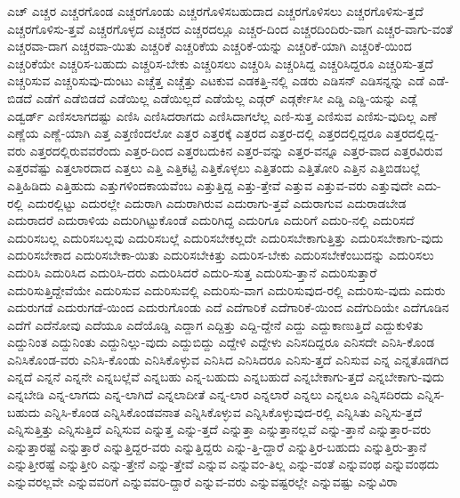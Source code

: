 {ಎಚ್
ಎಚ್ಚರ
ಎಚ್ಚರಗೊಂಡ
ಎಚ್ಚರಗೊಂಡು
ಎಚ್ಚರಗೊಳಿಸಬಹುದಾದ
ಎಚ್ಚರಗೊಳಿಸಲು
ಎಚ್ಚರಗೊಳಿಸು-ತ್ತದೆ
ಎಚ್ಚರಗೊಳಿಸು-ತ್ತವೆ
ಎಚ್ಚರಗೊಳ್ಳದ
ಎಚ್ಚರದ
ಎಚ್ಚರದಲ್ಲೂ
ಎಚ್ಚರ-ದಿಂದ
ಎಚ್ಚರದಿಂದಿರು-ವಾಗ
ಎಚ್ಚರ-ವಾಗು-ವಂತೆ
ಎಚ್ಚರವಾ-ದಾಗ
ಎಚ್ಚರವಾ-ಯಿತು
ಎಚ್ಚರಿಕೆ
ಎಚ್ಚರಿಕೆಯ
ಎಚ್ಚರಿಕೆ-ಯನ್ನು
ಎಚ್ಚರಿಕೆ-ಯಾಗಿ
ಎಚ್ಚರಿಕೆ-ಯಿಂದ
ಎಚ್ಚರಿಕೆಯೇ
ಎಚ್ಚರಿಸ-ಬಹುದು
ಎಚ್ಚರಿಸ-ಬೇಕು
ಎಚ್ಚರಿಸಲು
ಎಚ್ಚರಿಸಿ
ಎಚ್ಚರಿಸಿದ್ದ
ಎಚ್ಚರಿಸಿದ್ದರೂ
ಎಚ್ಚರಿಸು-ತ್ತದೆ
ಎಚ್ಚರಿಸುವ
ಎಚ್ಚರಿಸುವು-ದುಂಟು
ಎಚ್ಚೆತ್ತ
ಎಚ್ಚೆತ್ತು
ಎಟಕುವ
ಎಡಕತ್ತಿ-ನಲ್ಲಿ
ಎಡರು
ಎಡಿಸನ್
ಎಡಿಸನ್ನನ್ನು
ಎಡೆ
ಎಡೆ-ಬಿಡದೆ
ಎಡೆಗೆ
ಎಡೆಬಿಡದೆ
ಎಡೆಯಿಲ್ಲ
ಎಡೆಯಿಲ್ಲದೆ
ಎಡೆಯೆಲ್ಲ
ಎಡ್ಗರ್
ಎಡ್ಗರ್ಕೇಸೀ
ಎಡ್ಡಿ
ಎಡ್ಡಿ-ಯನ್ನು
ಎಡ್ಲೆ
ಎಡ್ವರ್ಡ್
ಎಣಿಸಲಾಗದಷ್ಟು
ಎಣಿಸಿ
ಎಣಿಸಿದರಾಗದು
ಎಣಿಸಿದಾಗಲೆಲ್ಲ
ಎಣಿ-ಸುತ್ತ
ಎಣಿಸುವ
ಎಣಿಸು-ವುದಿಲ್ಲ
ಎಣೆ
ಎಣ್ಣೆಯ
ಎಣ್ಣೆ-ಯಾಗಿ
ಎತ್ತ
ಎತ್ತಣಿಂದಲೋ
ಎತ್ತರ
ಎತ್ತರಕ್ಕೆ
ಎತ್ತರದ
ಎತ್ತರ-ದಲ್ಲಿ
ಎತ್ತರದಲ್ಲಿದ್ದರೂ
ಎತ್ತರದಲ್ಲಿದ್ದ-ವರು
ಎತ್ತರದಲ್ಲಿರುವವರೆಂದು
ಎತ್ತರ-ದಿಂದ
ಎತ್ತರಬದುಕಿನ
ಎತ್ತರ-ವನ್ನು
ಎತ್ತರ-ವನ್ನೂ
ಎತ್ತರ-ವಾದ
ಎತ್ತರವಿರುವ
ಎತ್ತರವೆಷ್ಟು
ಎತ್ತಲಾರದಾದ
ಎತ್ತಲು
ಎತ್ತಿ
ಎತ್ತಿಕಟ್ಟಿ
ಎತ್ತಿಕೊಳ್ಳಲು
ಎತ್ತಿತಂದು
ಎತ್ತಿತೋರಿ
ಎತ್ತಿನ
ಎತ್ತಿಬಿಡಬಲ್ಲೆ
ಎತ್ತಿಹಿಡಿದು
ಎತ್ತಿಹುದು
ಎತ್ತುಗಳಿಂದಕಾಯವೆಂಬ
ಎತ್ತುತ್ತಿದ್ದ
ಎತ್ತು-ತ್ತೇವೆ
ಎತ್ತುವ
ಎತ್ತುವ-ವರು
ಎತ್ತುವುದೇ
ಎದು-ರಲ್ಲಿ
ಎದುರಲ್ಲಿಟ್ಟು
ಎದುರಲ್ಲೇ
ಎದುರಾಗಿ
ಎದುರಾಗಿರುವ
ಎದುರಾಗು-ತ್ತವೆ
ಎದುರಾಗುವ
ಎದುರಾಡಬೇಡ
ಎದುರಾದರೆ
ಎದುರಾಳಿಯ
ಎದುರಿಗಿಟ್ಟುಕೊಂಡೆ
ಎದುರಿಗಿದ್ದ
ಎದುರಿಗೂ
ಎದುರಿಗೆ
ಎದುರಿ-ನಲ್ಲಿ
ಎದುರಿಸದೆ
ಎದುರಿಸಬಲ್ಲ
ಎದುರಿಸಬಲ್ಲವು
ಎದುರಿಸಬಲ್ಲೆ
ಎದುರಿಸಬೇಕಲ್ಲದೇ
ಎದುರಿಸಬೇಕಾಗುತ್ತಿತ್ತು
ಎದುರಿಸಬೇಕಾಗು-ವುದು
ಎದುರಿಸಬೇಕಾದ
ಎದುರಿಸಬೇಕಾ-ಯಿತು
ಎದುರಿಸಬೇಕಿತ್ತು
ಎದುರಿಸ-ಬೇಕು
ಎದುರಿಸಬೇಕೆಂಬುದನ್ನು
ಎದುರಿಸಲು
ಎದುರಿಸಿ
ಎದುರಿಸಿದ
ಎದುರಿಸಿ-ದರು
ಎದುರಿಸಿದರೆ
ಎದುರಿ-ಸುತ್ತ
ಎದುರಿಸು-ತ್ತಾನೆ
ಎದುರಿಸುತ್ತಾರೆ
ಎದುರಿಸುತ್ತಿದ್ದೇವೆಯೇ
ಎದುರಿಸುವ
ಎದುರಿಸುವಲ್ಲಿ
ಎದುರಿಸು-ವಾಗ
ಎದುರಿಸುವುದ-ರಲ್ಲಿ
ಎದುರಿಸು-ವುದು
ಎದುರು
ಎದುರುಗಡೆ
ಎದುರುಗಡೆ-ಯಿಂದ
ಎದುರುಗೊಂಡು
ಎದೆ
ಎದೆಗಾರಿಕೆ
ಎದೆಗಾರಿಕೆ-ಯಿಂದ
ಎದೆಗುದಿಯೇ
ಎದೆಗೂಡಿನ
ಎದೆಗೆ
ಎದೆನೋವು
ಎದೆಯೂ
ಎದೆಯೊಡ್ಡಿ
ಎದ್ದಾಗ
ಎದ್ದಿತ್ತು
ಎದ್ದಿ-ದ್ದೇನೆ
ಎದ್ದು
ಎದ್ದುಕಾಣುತ್ತಿದೆ
ಎದ್ದುಕುಳಿತು
ಎದ್ದುನಿಂತ
ಎದ್ದುನಿಂತು
ಎದ್ದುನಿಲ್ಲು-ವುದು
ಎದ್ದುಬಿದ್ದು
ಎದ್ದೇಳಿ
ಎದ್ದೇಳು
ಎನಿಸದಿದ್ದರೂ
ಎನಿಸದೇ
ಎನಿಸಿ-ಕೊಂಡ
ಎನಿಸಿಕೊಂಡ-ವರು
ಎನಿಸಿ-ಕೊಂಡು
ಎನಿಸಿಕೊಳ್ಳುವ
ಎನಿಸಿದ
ಎನಿಸಿದರೂ
ಎನಿಸು-ತ್ತದೆ
ಎನಿಸುವ
ಎನ್ನ
ಎನ್ನತೊಡಗಿದ
ಎನ್ನದೆ
ಎನ್ನನೆ
ಎನ್ನನೇ
ಎನ್ನಬಲ್ಲೆವೆ
ಎನ್ನಬಹು
ಎನ್ನ-ಬಹುದು
ಎನ್ನಬಹುದೆ
ಎನ್ನಬೇಕಾಗು-ತ್ತದೆ
ಎನ್ನಬೇಕಾಗು-ವುದು
ಎನ್ನಬೇಡಿ
ಎನ್ನ-ಲಾಗದು
ಎನ್ನ-ಲಾಗಿದೆ
ಎನ್ನಲಾದೀತೆ
ಎನ್ನ-ಲಾರ
ಎನ್ನಲಾರೆ
ಎನ್ನಲು
ಎನ್ನಲೂ
ಎನ್ನಿಸದಿರದು
ಎನ್ನಿಸ-ಬಹುದು
ಎನ್ನಿಸಿ-ಕೊಂಡ
ಎನ್ನಿಸಿಕೊಂಡವನಾತ
ಎನ್ನಿಸಿಕೊಳ್ಳುವ
ಎನ್ನಿಸಿಕೊಳ್ಳುವುದ-ರಲ್ಲಿ
ಎನ್ನಿಸಿತು
ಎನ್ನಿಸು-ತ್ತದೆ
ಎನ್ನಿಸುತ್ತಿತ್ತು
ಎನ್ನಿಸುತ್ತಿದೆ
ಎನ್ನಿಸುವ
ಎನ್ನುತ್ತ
ಎನ್ನು-ತ್ತದೆ
ಎನ್ನುತ್ತಾ
ಎನ್ನುತ್ತಾನಲ್ಲವೆ
ಎನ್ನು-ತ್ತಾನೆ
ಎನ್ನುತ್ತಾರ-ವರು
ಎನ್ನುತ್ತಾರಷ್ಟೆ
ಎನ್ನುತ್ತಾರೆ
ಎನ್ನುತ್ತಿದ್ದರ-ವರು
ಎನ್ನುತ್ತಿದ್ದರು
ಎನ್ನು-ತ್ತಿ-ದ್ದಾರೆ
ಎನ್ನುತ್ತಿರ-ಬಹುದು
ಎನ್ನುತ್ತಿರು-ತ್ತಾನೆ
ಎನ್ನುತ್ತೀರಷ್ಟೆ
ಎನ್ನುತ್ತೀರಿ
ಎನ್ನು-ತ್ತೇನೆ
ಎನ್ನು-ತ್ತೇವೆ
ಎನ್ನುವ
ಎನ್ನುವಂ-ತಿಲ್ಲ
ಎನ್ನು-ವಂತೆ
ಎನ್ನುವಂಥ
ಎನ್ನುವಂಥದು
ಎನ್ನುವರಲ್ಲವೇ
ಎನ್ನುವವರಿಗೆ
ಎನ್ನುವವರಿ-ದ್ದಾರೆ
ಎನ್ನುವ-ವರು
ಎನ್ನುವಷ್ಟರಲ್ಲೇ
ಎನ್ನುವಷ್ಟು
ಎನ್ನುವಿರಾ
}
